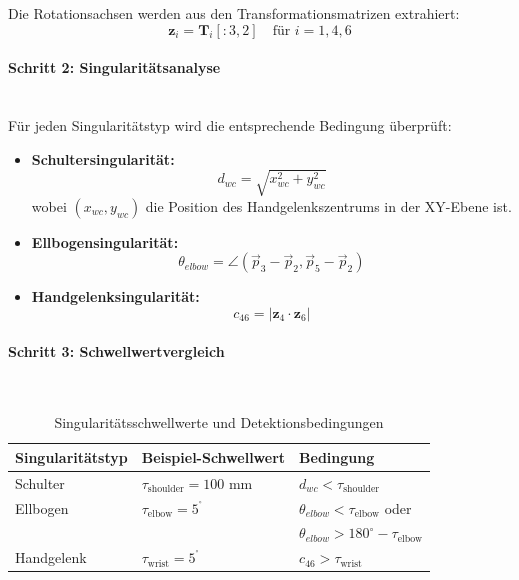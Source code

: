 Die Rotationsachsen werden aus den Transformationsmatrizen extrahiert:
\begin{equation}
  \mathbf{z}_i = \mathbf{T}_i[:3, 2] \quad \text{für } i = 1, 4, 6
  \label{eq:axis_extraction}
\end{equation}

\paragraph{Schritt 2: Singularitätsanalyse}~\\
Für jeden Singularitätstyp wird die entsprechende Bedingung überprüft:
\begin{itemize}
  \item \textbf{Schultersingularität:}
    \begin{equation}
      d_{wc} = \sqrt{x_{wc}^2 + y_{wc}^2}
    \end{equation}
    wobei $(x_{wc}, y_{wc})$ die Position des Handgelenkszentrums in
    der XY-Ebene ist.

  \item \textbf{Ellbogensingularität:}
    \begin{equation}
      \theta_{elbow} = \angle(\vec{p}_3 - \vec{p}_2, \vec{p}_5 - \vec{p}_2)
    \end{equation}

  \item \textbf{Handgelenksingularität:}
    \begin{equation}
      c_{46} = |\mathbf{z}_4 \cdot \mathbf{z}_6|
    \end{equation}
\end{itemize}

\paragraph{Schritt 3: Schwellwertvergleich}~\\
\begin{table}[H]
  \centering
  \begin{tabular}{l l l}
    \hline
    \textbf{Singularitätstyp} & \textbf{Beispiel-Schwellwert}      &
    \textbf{Bedingung}                            \\
    \hline
    Schulter                  & $\tau_{\text{shoulder}} = 100$ mm  &
    $d_{wc} < \tau_{\text{shoulder}}$             \\
    Ellbogen                  & $\tau_{\text{elbow}} = 5^{^\circ}$ &
    $\theta_{elbow} < \tau_{\text{elbow}}$ oder   \\
    &                                    & $\theta_{elbow} >
    180^\circ - \tau_{\text{elbow}}$ \\
    Handgelenk                & $\tau_{\text{wrist}} = 5^{^\circ}$ &
    $c_{46} > \tau_{\text{wrist}}$                \\
    \hline
  \end{tabular}
  \caption{Singularitätsschwellwerte und Detektionsbedingungen}
  \label{tab:singularity_thresholds}
\end{table}

